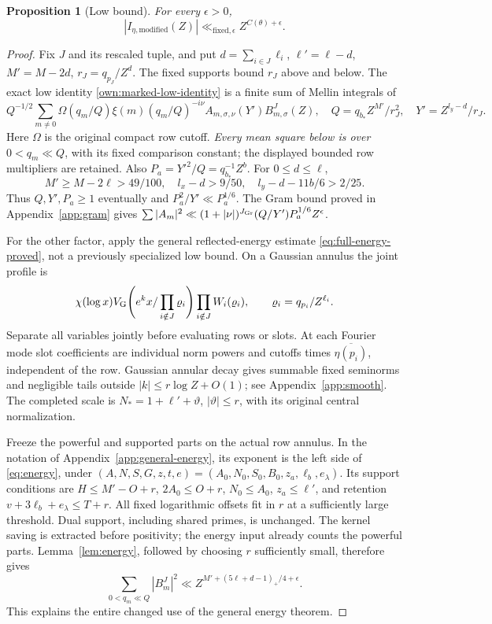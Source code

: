 \documentclass[12pt]{article}
\newtheorem{proposition}[theorem]{Proposition}
\begin{document}
\begin{proposition}[Low bound]\label{prop:low}
For every \(\epsilon>0\),
\[
 |I_{\eta,\mathrm{modified}}(Z)|
       \ll_{\mathrm{fixed},\epsilon}Z^{C(\theta)+\epsilon}.
\]
\end{proposition}
\begin{proof}
Fix \(J\) and its rescaled tuple, and put
\(d=\sum_{i\in J}\ell_i\), \(\ell'=\ell-d\),
\(M'=M-2d\), \(r_J=q_{p_J}/Z^d\).
The fixed supports bound \(r_J\) above and below.  The exact low
identity \eqref{own:marked-low-identity} is a finite sum of Mellin integrals of
\[
 Q^{-1/2}\sum_{m\ne0}\Omega(q_m/Q)\xi(m)(q_m/Q)^{-i\nu}
                     A_{m,\sigma,\nu}(Y')B^J_{m,\sigma}(Z),
 \quad
 Q=q_{b_*}Z^{M'}/r_J^2,\quad Y'=Z^{l_y-d}/r_J.
\]
Here \(\Omega\) is the original compact row cutoff.  \emph{Every
mean square below is over \(0<q_m\ll Q\)}, with its fixed
comparison constant; the displayed bounded row multipliers are
retained.  Also \(P_a=Y'^2/Q=q_{b_*}^{-1}Z^b\).
For \(0\le d\le\ell\),
\[
 M'\ge M-2\ell>49/100,\quad l_x-d>9/50,\quad
 l_y-d-11b/6>2/25.
\]
Thus \(Q,Y',P_a\ge1\) eventually and \(P_a^2/Y'\ll P_a^{1/6}\).
The Gram bound proved in
Appendix~\ref{app:gram} gives
\(\sum|A_m|^2\ll (1+|\nu|)^{J_{\rm Gr}}(Q/Y')P_a^{1/6}Z^\epsilon\).

For the other factor, apply the general reflected-energy estimate
\eqref{eq:full-energy-proved}, not a previously specialized low bound.  On a Gaussian annulus
the joint profile is
\[
 \chi(\log x)V_{\rm G}\!\left(e^kx/
          \prod_{i\notin J}\varrho_i\right)
             \prod_{i\notin J}W_i(\varrho_i),
 \qquad\varrho_i=q_{p_i}/Z^{\ell_i}.
\]
Separate all variables jointly before evaluating rows or slots.
At each Fourier mode slot coefficients are individual norm powers
and cutoffs times \(\overline{\eta(p_i)}\), independent of the row.
Gaussian annular decay gives summable fixed seminorms and negligible
tails outside \(|k|\le r\log Z+O(1)\); see
Appendix~\ref{app:smooth}.  The completed scale is
\(N_*=1+\ell'+\vartheta\), \(|\vartheta|\le r\), with its original
central normalization.

Freeze the powerful and supported parts on the actual row annulus.
In the notation of Appendix~\ref{app:general-energy}, its exponent is the left side
of \eqref{eq:energy}, under
\((A,N,S,G,z,t,e)=(A_0,N_0,S_0,B_0,z_a,\ell_b,e_\lambda)\).
Its support conditions are \(H\le M'-O+r\), \(2A_0\le O+r\),
\(N_0\le A_0\), \(z_a\le\ell'\), and retention
\(v+3\ell_b+e_\lambda\le T+r\).
All fixed logarithmic offsets fit in \(r\) at a sufficiently large
threshold.  Dual support, including shared primes, is unchanged.
The kernel saving is extracted before positivity; the energy input
already counts the powerful parts.  Lemma~\ref{lem:energy}, followed
by choosing \(r\) sufficiently small, therefore gives
\[
 \sum_{0<q_m\ll Q}|B^J_m|^2
       \ll Z^{M'+(5\ell+d-1)_+/4+\epsilon}.
\]
This explains the entire changed use of the general energy theorem.


\end{proof}
\end{document}

